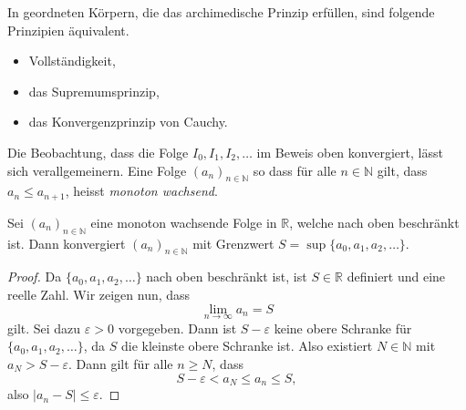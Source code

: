 \documentclass[../main.tex]{subfiles}
\begin{document}
\begin{remark}
  In geordneten Körpern,
  die das archimedische Prinzip erfüllen,
  sind folgende Prinzipien äquivalent.
  \begin{itemize}
    \item Vollständigkeit,
    \item das Supremumsprinzip,
    \item das Konvergenzprinzip von Cauchy.
  \end{itemize}
  
\end{remark}


Die Beobachtung, dass die Folge $I_0, I_1, I_2, \dots$
im Beweis oben konvergiert, lässt sich verallgemeinern.
Eine Folge ${(a_{n})}_{n \in \mathbb{N}}$ 
so dass für alle $n \in \mathbb{N}$ gilt,
dass $a_n \leq a_{n+1}$, heisst \emph{monoton wachsend}.

\begin{monotony}
  Sei ${(a_n)}_{n \in \mathbb{N}}$ eine monoton wachsende
  Folge in $\mathbb{R}$,
  welche nach oben beschränkt ist.
  Dann konvergiert ${(a_n)}_{n \in \mathbb{N}}$ mit
  Grenzwert
  \(
    S = \sup \{a_0, a_1, a_2, \dots\}.
  \)
\end{monotony}

\begin{proof}
  Da $\{a_0, a_1, a_2, \dots\}$ nach oben beschränkt ist,
  ist $S \in \mathbb{R}$ definiert und eine reelle Zahl.
  Wir zeigen nun, dass
  \[
    \lim_{n \to \infty} a_n = S
  \]
  gilt.
  Sei dazu $\varepsilon > 0$ vorgegeben. 
  Dann ist $S - \varepsilon$ keine obere Schranke
  für $\{a_0, a_1, a_2, \dots\}$,
  da $S$ die kleinste obere Schranke ist.
  Also existiert $N \in \mathbb{N}$ mit
  $a_N > S - \varepsilon$.
  Dann gilt für alle $n \geq N$, dass
  \[
    S - \varepsilon < a_N \leq a_n \leq S,
  \]
  also $|a_n - S| \leq \varepsilon$.
\end{proof}
\end{document}
